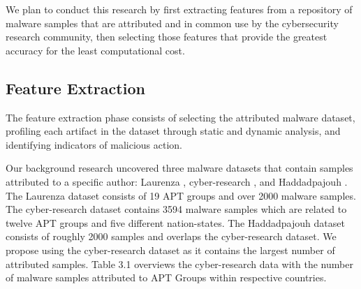 \documentclass[12pt]{report}
\begin{document}
We plan to conduct this research by first extracting features from a repository of malware samples that are attributed and  in common use by the cybersecurity research community, then selecting those features that provide the greatest accuracy for the least computational cost. 

\subsection{Feature Extraction}

The feature extraction phase consists of selecting the attributed malware dataset, profiling each artifact in the dataset through static and dynamic analysis, and identifying indicators of malicious action.     

Our background research uncovered three malware datasets that contain samples attributed to a specific author:   Laurenza \cite{laurenza2019daptaset}, cyber-research \cite{APTMalware2022}, and Haddadpajouh \cite{haddadpajouh2020mvfcc}.   The Laurenza dataset consists of 19 APT groups and over 2000 malware samples.  The cyber-research dataset contains 3594 malware samples which are related to twelve APT groups and five different nation-states.  The Haddadpajouh dataset consists of roughly 2000 samples and overlaps the cyber-research dataset.  We propose using the cyber-research dataset as it contains the largest number of attributed samples.    Table 3.1 overviews the cyber-research data with the number of malware samples attributed to APT Groups within respective countries. 
\end{document}
